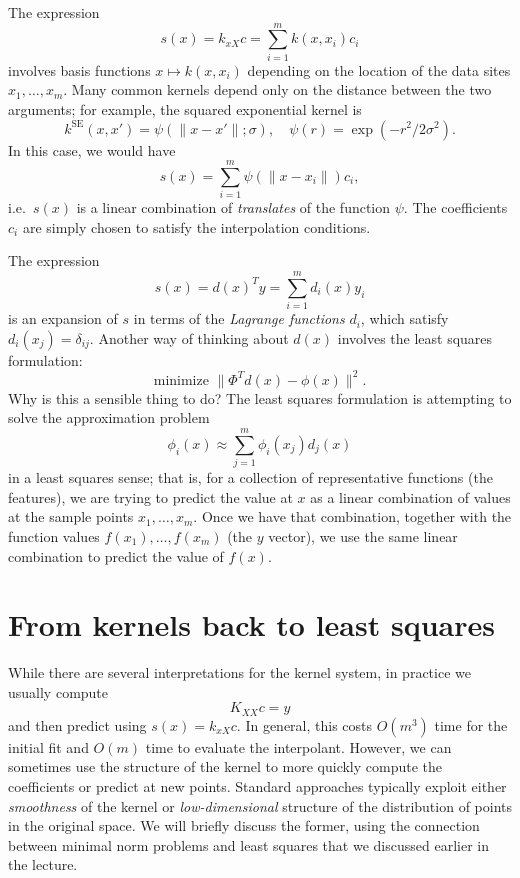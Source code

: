 \documentclass[12pt, leqno]{article} %
\begin{document}
The expression
\[
  s(x) = k_{xX} c = \sum_{i=1}^m k(x,x_i) c_i
\]
involves basis functions $x \mapsto k(x,x_i)$ depending on the
location of the data sites $x_1, \ldots, x_m$.  Many common kernels
depend only on the distance between the two arguments; for example,
the squared exponential kernel is
\[
  k^{\mbox{SE}}(x, x') = \psi(\|x-x'\|; \sigma), \quad
  \psi(r) = \exp(-r^2/2 \sigma^2).
\]
In this case, we would have
\[
  s(x) = \sum_{i=1}^m \psi(\|x-x_i\|) c_i,
\]
i.e.~$s(x)$ is a linear combination of {\em translates} of the function
$\psi$.  The coefficients $c_i$ are simply chosen to satisfy the
interpolation conditions.

The expression
\[
  s(x) = d(x)^T y = \sum_{i=1}^m d_i(x) y_i
\]
is an expansion of $s$ in terms of the {\em Lagrange functions} $d_i$,
which satisfy $d_i(x_j) = \delta_{ij}$.  Another way of thinking about
$d(x)$ involves the least squares formulation:
\[
  \mbox{minimize } \|\Phi^T d(x) - \phi(x)\|^2.
\]
Why is this a sensible thing to do?  The least squares formulation is
attempting to solve the approximation problem
\[
  \phi_i(x) \approx \sum_{j=1}^m \phi_i(x_j) d_j(x)
\]
in a least squares sense; that is, for a collection of representative
functions (the features), we are trying to predict the value at $x$
as a linear combination of values at the sample points $x_1, \ldots, x_m$.
Once we have that combination, together with the function values
$f(x_1), \ldots, f(x_m)$ (the $y$ vector), we use the same linear
combination to predict the value of $f(x)$.

\section{From kernels back to least squares}


While there are several interpretations for the kernel system,
in practice we usually compute
\[
  K_{XX} c = y
\]
and then predict using $s(x) = k_{xX} c$.  In general, this costs
$O(m^3)$ time for the initial fit and $O(m)$ time to evaluate the
interpolant.  However, we can sometimes use the structure of the
kernel to more quickly compute the coefficients or predict at new
points.  Standard approaches typically exploit either {\em smoothness}
of the kernel or {\em low-dimensional} structure of the distribution
of points in the original space.  We will briefly discuss the former,
using the connection between minimal norm problems and least squares
that we discussed earlier in the lecture.
\end{document}
